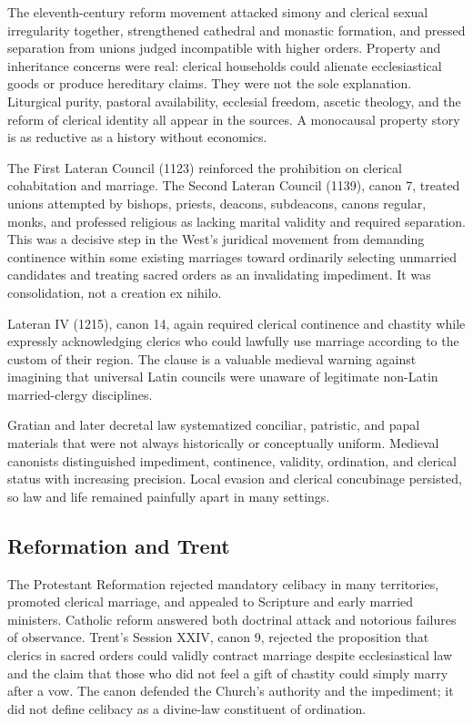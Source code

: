 The eleventh-century reform movement attacked simony and clerical sexual irregularity together, strengthened cathedral and monastic formation, and pressed separation from unions judged incompatible with higher orders. Property and inheritance concerns were real: clerical households could alienate ecclesiastical goods or produce hereditary claims. They were not the sole explanation. Liturgical purity, pastoral availability, ecclesial freedom, ascetic theology, and the reform of clerical identity all appear in the sources. A monocausal property story is as reductive as a history without economics.

The First Lateran Council (1123) reinforced the prohibition on clerical cohabitation and marriage. The Second Lateran Council (1139), canon 7, treated unions attempted by bishops, priests, deacons, subdeacons, canons regular, monks, and professed religious as lacking marital validity and required separation. This was a decisive step in the West's juridical movement from demanding continence within some existing marriages toward ordinarily selecting unmarried candidates and treating sacred orders as an invalidating impediment. It was consolidation, not a creation ex nihilo.

Lateran IV (1215), canon 14, again required clerical continence and chastity while expressly acknowledging clerics who could lawfully use marriage according to the custom of their region. The clause is a valuable medieval warning against imagining that universal Latin councils were unaware of legitimate non-Latin married-clergy disciplines.

Gratian and later decretal law systematized conciliar, patristic, and papal materials that were not always historically or conceptually uniform. Medieval canonists distinguished impediment, continence, validity, ordination, and clerical status with increasing precision. Local evasion and clerical concubinage persisted, so law and life remained painfully apart in many settings.

\subsection{Reformation and Trent}

The Protestant Reformation rejected mandatory celibacy in many territories, promoted clerical marriage, and appealed to Scripture and early married ministers. Catholic reform answered both doctrinal attack and notorious failures of observance. Trent's Session XXIV, canon 9, rejected the proposition that clerics in sacred orders could validly contract marriage despite ecclesiastical law and the claim that those who did not feel a gift of chastity could simply marry after a vow. The canon defended the Church's authority and the impediment; it did not define celibacy as a divine-law constituent of ordination.

